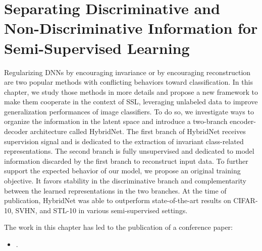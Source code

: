 
\chapter{Separating Discriminative and Non-Discriminative Information for Semi-Supervised Learning}
\label{chapter:hybridnet}

\renewcommand{\leftmark}{\spacedlowsmallcaps{Separating Discriminative and Non-Discriminative Information}}

\begin{chapabstract}
	\acresetall
	{\em
  
  Regularizing \acfp{DNN} by encouraging invariance or by encouraging reconstruction are two popular methods with conflicting behaviors toward classification. In this chapter, we study those methods in more details and propose a new framework to make them cooperate in the context of \acf{SSL}, leveraging unlabeled data to improve generalization performances of image classifiers. To do so, we investigate ways to organize the information in the latent space and introduce a two-branch encoder-decoder architecture called HybridNet. The first branch of HybridNet receives supervision signal and is dedicated to the extraction of invariant class-related representations. The second branch is fully unsupervised and dedicated to model information  discarded by the first branch to reconstruct input data. To further support the expected behavior of our model, we propose an original training objective. It favors stability in the discriminative branch and complementarity between the learned representations in the two branches. At the time of publication, HybridNet was able to outperform state-of-the-art results on CIFAR-10, SVHN, and STL-10 in various semi-supervised settings. %

	\vspace*{5mm}
	The work in this chapter has led to the publication of a conference paper:}
	\begin{itemize}
		\item \small {}.
	\end{itemize}
\end{chapabstract}



\newpage

\minitoc
{}



